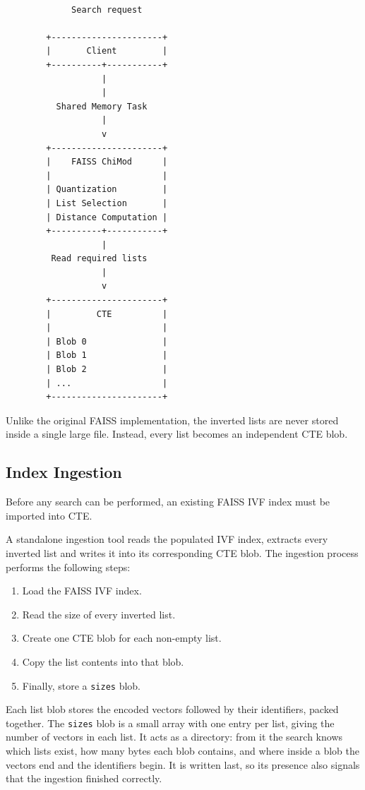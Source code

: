\documentclass[11pt]{article}
\begin{document}
\begin{verbatim}

             Search request

        +----------------------+
        |       Client         |
        +----------+-----------+
                   |
                   |
          Shared Memory Task
                   |
                   v
        +----------------------+
        |    FAISS ChiMod      |
        |                      |
        | Quantization         |
        | List Selection       |
        | Distance Computation |
        +----------+-----------+
                   |
         Read required lists
                   |
                   v
        +----------------------+
        |         CTE          |
        |                      |
        | Blob 0               |
        | Blob 1               |
        | Blob 2               |
        | ...                  |
        +----------------------+

\end{verbatim}

Unlike the original FAISS implementation, the inverted lists are
never stored inside a single large file. Instead, every list becomes
an independent CTE blob.

\subsection{Index Ingestion}

Before any search can be performed, an existing FAISS IVF index must
be imported into CTE.

A standalone ingestion tool reads the populated IVF index, extracts
every inverted list and writes it into its corresponding CTE blob.
The ingestion process performs the following steps:

\begin{enumerate}
\item Load the FAISS IVF index.
\item Read the size of every inverted list.
\item Create one CTE blob for each non-empty list.
\item Copy the list contents into that blob.
\item Finally, store a \texttt{sizes} blob.
\end{enumerate}

Each list blob stores the encoded vectors followed by their
identifiers, packed together. The \texttt{sizes} blob is a small
array with one entry per list, giving the number of vectors in each
list. It acts as a directory: from it the search knows which lists
exist, how many bytes each blob contains, and where inside a blob the
vectors end and the identifiers begin. It is written last, so its
presence also signals that the ingestion finished correctly.
\end{document}

